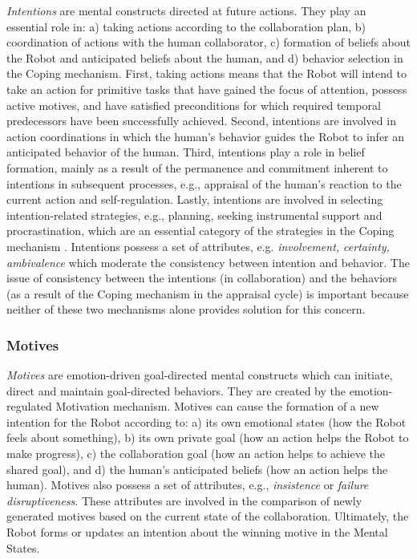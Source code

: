 \textit{Intentions} are mental constructs directed at future actions. They play
an essential role in: a) taking actions according to the collaboration plan, b)
coordination of actions with the human collaborator, c) formation of beliefs
about the Robot and anticipated beliefs about the human, and d) behavior
selection in the Coping mechanism. First, taking actions means that the Robot
will intend to take an action for primitive tasks that have gained the focus of
attention, possess active motives, and have satisfied preconditions for which
required temporal predecessors have been successfully achieved. Second,
intentions are involved in action coordinations in which the human's behavior
guides the Robot to infer an anticipated behavior of the human. Third,
intentions play a role in belief formation, mainly as a result of the permanence
and commitment inherent to intentions in subsequent processes, e.g., appraisal
of the human's reaction to the current action and self-regulation. Lastly,
intentions are involved in selecting intention-related strategies, e.g.,
planning, seeking instrumental support and procrastination, which are an
essential category of the strategies in the Coping mechanism
\cite{marsella:ema-process-model}. Intentions possess a set of attributes, e.g.
\textit{involvement, certainty, ambivalence} which moderate the consistency
between intention and behavior. The issue of consistency between the intentions
(in collaboration) and the behaviors (as a result of the Coping mechanism in the
appraisal cycle) is important because neither of these two mechanisms alone
provides solution for this concern.

\subsubsection{Motives}
\label{sec:motives}

\textit{Motives} are emotion-driven goal-directed mental constructs which can
initiate, direct and maintain goal-directed behaviors. They are created by the
emotion-regulated Motivation mechanism. Motives can cause the formation of a new
intention for the Robot according to: a) its own emotional states (how the Robot
feels about something), b) its own private goal (how an action helps the Robot
to make progress), c) the collaboration goal (how an action helps to achieve the
shared goal), and d) the human's anticipated beliefs (how an action helps the
human). Motives also possess a set of attributes, e.g., \textit{insistence} or
\textit{failure disruptiveness}. These attributes are involved in the comparison
of newly generated motives based on the current state of the collaboration.
Ultimately, the Robot forms or updates an intention about the winning motive in
the Mental States.

